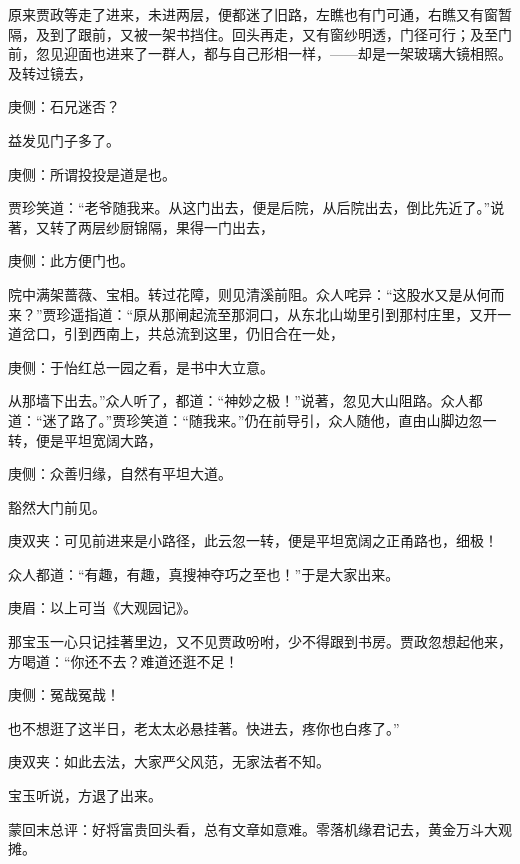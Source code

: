 \begin{parag}
    原来贾政等走了进来，未进两层，便都迷了旧路，左瞧也有门可通，右瞧又有窗暂隔，及到了跟前，又被一架书挡住。回头再走，又有窗纱明透，门径可行；及至门前，忽见迎面也进来了一群人，都与自己形相一样，——却是一架玻璃大镜相照。及转过镜去，\begin{note}庚侧：石兄迷否？\end{note}益发见门子多了。\begin{note}庚侧：所谓投投是道是也。\end{note}贾珍笑道：“老爷随我来。从这门出去，便是后院，从后院出去，倒比先近了。”说著，又转了两层纱厨锦隔，果得一门出去，\begin{note}庚侧：此方便门也。\end{note}院中满架蔷薇、宝相。转过花障，则见清溪前阻。众人咤异：“这股水又是从何而来？”贾珍遥指道：“原从那闸起流至那洞口，从东北山坳里引到那村庄里，又开一道岔口，引到西南上，共总流到这里，仍旧合在一处，\begin{note}庚侧：于怡红总一园之看，是书中大立意。\end{note}从那墙下出去。”众人听了，都道：“神妙之极！”说著，忽见大山阻路。众人都道：“迷了路了。”贾珍笑道：“随我来。”仍在前导引，众人随他，直由山脚边忽一转，便是平坦宽阔大路，\begin{note}庚侧：众善归缘，自然有平坦大道。\end{note}豁然大门前见。\begin{note}庚双夹：可见前进来是小路径，此云忽一转，便是平坦宽阔之正甬路也，细极！\end{note}众人都道：“有趣，有趣，真搜神夺巧之至也！”于是大家出来。\begin{note}庚眉：以上可当《大观园记》。\end{note}那宝玉一心只记挂著里边，又不见贾政吩咐，少不得跟到书房。贾政忽想起他来，方喝道：“你还不去？难道还逛不足！\begin{note}庚侧：冤哉冤哉！\end{note}也不想逛了这半日，老太太必悬挂著。快进去，疼你也白疼了。”\begin{note}庚双夹：如此去法，大家严父风范，无家法者不知。\end{note}宝玉听说，方退了出来。
\end{parag}


\begin{parag}
    \begin{note}蒙回末总评：好将富贵回头看，总有文章如意难。零落机缘君记去，黄金万斗大观摊。\end{note}
\end{parag}


